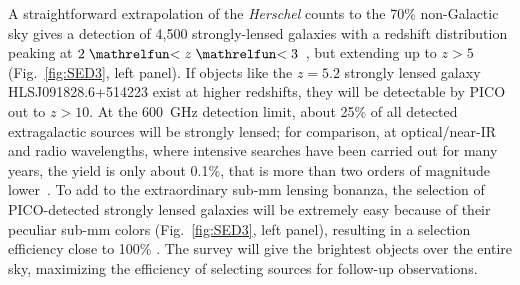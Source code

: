 \documentclass[PICOReport.tex]{subfiles}
\begin{document}
A straightforward extrapolation of the \textit{Herschel} counts to the 70\% non-Galactic sky gives a detection of 4,500 strongly-lensed galaxies with a redshift distribution peaking at $2\simlt z \simlt 3$~\cite{Negrello2017lensed}, but extending up to $z> 5$ (Fig.~\ref{fig:SED3}, left panel).
If objects like the $z=5.2$ strongly lensed galaxy HLSJ091828.6+514223 exist at higher redshifts, they will be detectable by PICO out to $z>10$. At the 600~GHz detection limit, about 25\% of all detected extragalactic sources will be strongly lensed; for comparison, at optical/near-IR and radio wavelengths, where intensive searches have been carried out for many years, the yield is only about 0.1\%, that is more than two orders of magnitude lower~\cite{Treu2010}. To add to the extraordinary sub-mm lensing bonanza, the selection of PICO-detected strongly lensed galaxies will be extremely easy because of their peculiar sub-mm colors (Fig.~\ref{fig:SED3}, left panel), resulting in a selection efficiency close to 100\% \citep{Negrello2010}. The survey will give the brightest objects over the entire sky, maximizing the efficiency of selecting sources for follow-up observations. 
\end{document}
